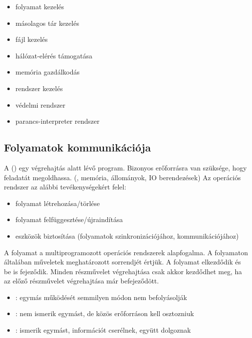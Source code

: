 \documentclass[../main.tex]{subfiles}
\begin{document}
\begin{multicols}{2}
  \begin{itemize}
    \item folyamat kezelés
    \item másolagos tár kezelés
    \item fájl kezelés
    \item hálózat-elérés támogatása
    \item memória gazdálkodás
    \item {} rendszer kezelés
    \item védelmi rendszer
    \item parancs-interpreter rendszer
  \end{itemize}
\end{multicols}

\subsection{Folyamatok kommunikációja}

A  () egy végrehajtás alatt lévő program.
Bizonyos erőforrásra van szüksége, hogy feladatát megoldhassa.
(, memória, állományok, IO berendezések)
Az operációs rendszer az alábbi tevékenységekért felel:
\begin{itemize}
  \item folyamat létrehozása/törlése
  \item folyamat felfüggesztése/újraindítása
  \item eszközök biztosítása
        (folyamatok szinkronizációjához, kommunikációjához)
\end{itemize}

A folyamat a multiprogramozott operációs rendszerek alapfogalma.
A folyamaton általában műveletek meghatározott sorrendjét értjük.
A folyamat elkezdődik és be is fejeződik.
Minden részművelet végrehajtása csak akkor kezdődhet meg,
ha az előző részművelet végrehajtása már befejeződött.
\begin{itemize}
  \item {}:
        egymás működését semmilyen módon nem befolyásolják

  \item {}:
        nem ismerik egymást, de közös erőforráson kell osztozniuk

  \item {}:
        ismerik egymást, információt cserélnek, együtt dolgoznak
\end{itemize}
\end{document}
